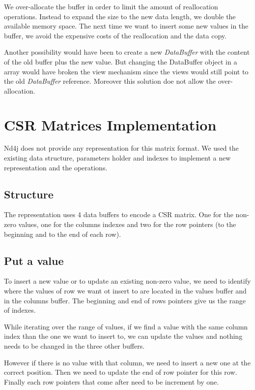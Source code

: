 We over-allocate the buffer in order to limit the amount of reallocation operations. Instead to expand the size to the new data length, we double the available memory space. The next time we want to insert some new values in the buffer, we avoid the expensive costs of the reallocation and the data copy.

Another possibility would have been to create a new \textit{DataBuffer} with the content of the old buffer plus the new value. But changing the DataBuffer object in a array would have broken the view mechanism since the views would still point to the old \textit{DataBuffer} reference. Moreover this solution doe not allow the over-allocation.


\section{CSR Matrices Implementation}

Nd4j does not provide any representation for this matrix format. We used the existing data structure, parameters holder and indexes to implement a new representation and the operations.

\subsection{Structure}

The representation uses 4 data buffers to encode a CSR matrix. One for the non-zero values, one for the columns indexes and two for the row pointers (to the beginning and to the end of each row).

\subsection{Put a value}

To insert a new value or to update an existing non-zero value, we need to identify where the values of row we want ot insert to are located in the values buffer and in the columns buffer. The beginning and end of rows pointers give us the range of indexes.

While iterating over the range of values, if we find a value with the same column index than the one we want to insert to, we can update the values and nothing needs to be changed in the three other buffers. 

However if there is no value with that column, we need to insert a new one at the correct position. Then we need to update the end of row pointer for this row. Finally each row pointers that come after need to be increment by one.

